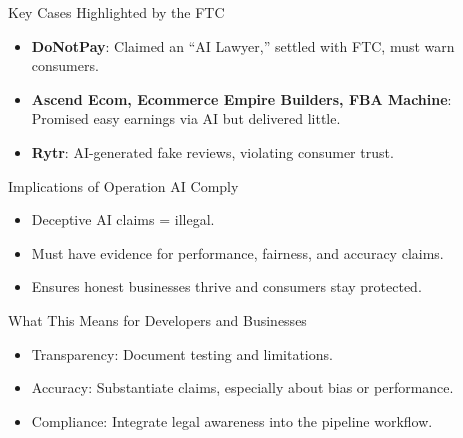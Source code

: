 \documentclass[aspectratio=169]{beamer}
\begin{document}
\begin{frame}{Key Cases Highlighted by the FTC}
\begin{itemize}
\item \textbf{DoNotPay}: Claimed an “AI Lawyer,” settled with FTC, must warn consumers.
\item \textbf{Ascend Ecom, Ecommerce Empire Builders, FBA Machine}: Promised easy earnings via AI but delivered little.
\item \textbf{Rytr}: AI-generated fake reviews, violating consumer trust.
\end{itemize}
\end{frame}

\begin{frame}{Implications of Operation AI Comply}
\begin{itemize}
\item Deceptive AI claims = illegal.
\item Must have evidence for performance, fairness, and accuracy claims.
\item Ensures honest businesses thrive and consumers stay protected.
\end{itemize}
\end{frame}

\begin{frame}{What This Means for Developers and Businesses}
\begin{itemize}
\item Transparency: Document testing and limitations.
\item Accuracy: Substantiate claims, especially about bias or performance.
\item Compliance: Integrate legal awareness into the pipeline workflow.
\end{itemize}
\end{frame}
\end{document}
